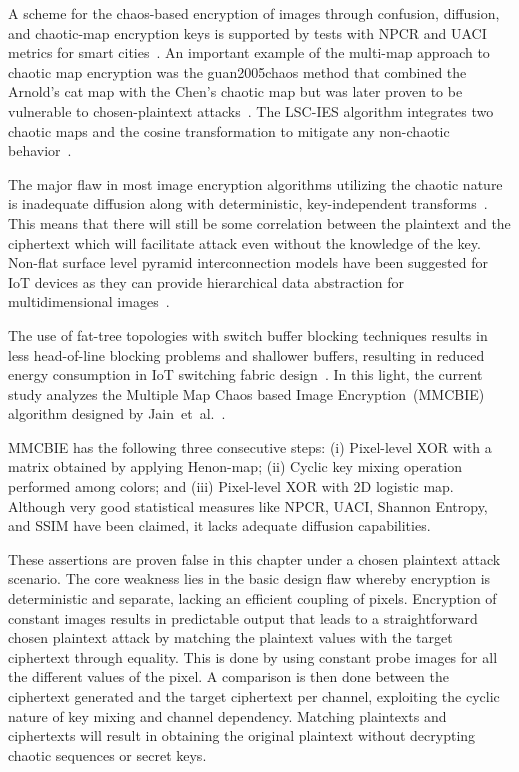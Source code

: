 A scheme for the chaos-based encryption of images through
confusion, diffusion, and chaotic-map encryption keys is
supported by tests with NPCR and UACI metrics for smart cities~\cite{singh2022smartcity}.
An important example of the multi-map approach to chaotic map
encryption was the guan2005chaos method that combined the
Arnold's cat map with the Chen's chaotic map but was
later proven to be vulnerable to chosen-plaintext attacks~\cite{guan2005chaos}.
The LSC-IES algorithm integrates two chaotic maps and the
cosine transformation to mitigate any non-chaotic behavior~\cite{hua2019cosine}.

The major flaw in most image encryption algorithms utilizing the
chaotic nature is inadequate diffusion along with deterministic,
key-independent transforms~\cite{xie2017cryptanalysis}. This means that
there will still be some correlation between the plaintext and the
ciphertext which will facilitate attack even without the knowledge of
the key. Non-flat surface level pyramid interconnection models have
been suggested for IoT devices as they can provide hierarchical data
abstraction for multidimensional images~\cite{shahhoseini2014nfsl}.

The use of fat-tree topologies with switch buffer blocking
techniques results in less head-of-line blocking problems
and shallower buffers, resulting in reduced energy
consumption in IoT switching fabric design~\cite{mohtavipour2020fattree}.
In this light, the current study analyzes the Multiple Map Chaos based Image
Encryption~(MMCBIE) algorithm designed by Jain~et~al.~\cite{jain2024mmcbie}.

MMCBIE has the following three consecutive steps:
(i) Pixel-level XOR with a matrix obtained by applying Henon-map;
(ii) Cyclic key mixing operation performed among colors; and 
(iii) Pixel-level XOR with 2D logistic map.
Although very good statistical measures like NPCR, UACI,
Shannon Entropy, and SSIM have been claimed, it lacks adequate
diffusion capabilities.

These assertions are proven false in this chapter under a chosen
plaintext attack scenario.
The core weakness lies in the basic design flaw whereby encryption is
deterministic and separate, lacking an efficient coupling of pixels.
Encryption of constant images results in predictable output that leads to
a straightforward chosen plaintext attack by matching the plaintext
values with the target ciphertext through equality. This is done by using
constant probe images for all the different values of the pixel.
A comparison is then done between the ciphertext generated and the
target ciphertext per channel, exploiting the cyclic nature of key mixing
and channel dependency. Matching plaintexts and ciphertexts will result
in obtaining the original plaintext without decrypting chaotic
sequences or secret keys.


